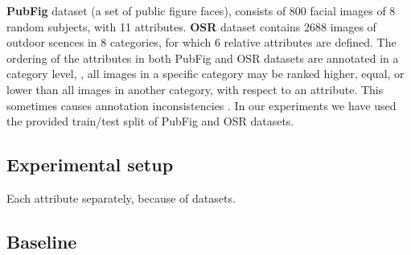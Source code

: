 \textbf{PubFig} \cite{parikh2011} dataset (a set of public figure faces), consists of 800 facial images of 8 random subjects, with 11 attributes.
\textbf{OSR} \cite{parikh2011} dataset contains 2688 images of outdoor scences in 8 categories, for which 6 relative attributes are defined.
The ordering of the attributes in both PubFig and OSR datasets are annotated in a category level, \ie, all images in a specific category may be ranked higher, equal, or lower than all images in another category, with respect to an attribute. This sometimes causes annotation inconsistencies \cite{Sandeep_2014_CVPR}.
In our experiments we have used the provided train/test split of PubFig and OSR datasets.


\subsection{Experimental setup}
Each attribute separately, because of datasets.
\subsection{Baseline}
